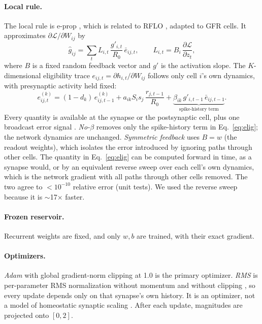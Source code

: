 \paragraph{Local rule.} The local rule is e-prop \citep{bellec2020eprop}, which is related to
RFLO \citep{murray2019rflo}, adapted to GFR cells. It approximates $\partial\mathcal L/\partial
W_{ij}$ by
\begin{equation}
\hat g_{ij}=\sum_t L_{i,t}\,\frac{g'_{i,t}}{R_0}\,\bar e_{ij,t},\qquad
L_{i,t}=B_i\,\frac{\partial \mathcal L}{\partial z_t},
\end{equation}
where $B$ is a fixed random feedback vector \citep{lillicrap2016fa} and $g'$ is the activation
slope. The $K$-dimensional eligibility trace $e_{ij,t}=\partial h_{i,t}/\partial W_{ij}$ follows
only cell $i$'s own dynamics, with presynaptic activity held fixed:
\begin{equation}
e^{(k)}_{ij,t}=(1-d_k)\,e^{(k)}_{ij,t-1}+a_{ik}S_i s_j\,\frac{r_{j,t-1}}{R_0}
+\underbrace{\beta_{ik}\,g'_{i,t-1}\,\bar e_{ij,t-1}}_{\text{spike-history term}}.\label{eq:elig}
\end{equation}
Every quantity is available at the synapse or the postsynaptic cell, plus one broadcast error
signal \citep{gerstner2018}. \emph{No-$\beta$} removes only the spike-history term in
Eq.~\ref{eq:elig}; the network dynamics are unchanged. \emph{Symmetric feedback} uses $B=w$ (the
readout weights), which isolates the error introduced by ignoring paths through other cells. The
quantity in Eq.~\ref{eq:elig} can be computed forward in time, as a synapse would, or by an
equivalent reverse sweep over each cell's own dynamics, which is the network gradient with all
paths through other cells removed. The two agree to $<10^{-10}$ relative error (unit tests). We
used the reverse sweep because it is $\sim$17$\times$ faster.

\paragraph{Frozen reservoir.} Recurrent weights are fixed, and only $w,b$ are trained, with their
exact gradient.

\paragraph{Optimizers.} \emph{Adam} \citep{kingma2015adam} with global gradient-norm clipping at
1.0 is the primary optimizer. \emph{RMS} is per-parameter RMS normalization without momentum and
without clipping \citep{tieleman2012rmsprop}, so every update depends only on that synapse's own
history. It is an optimizer, not a model of homeostatic synaptic scaling \citep{turrigiano2008}.
After each update, magnitudes are projected onto $[0,2]$.

